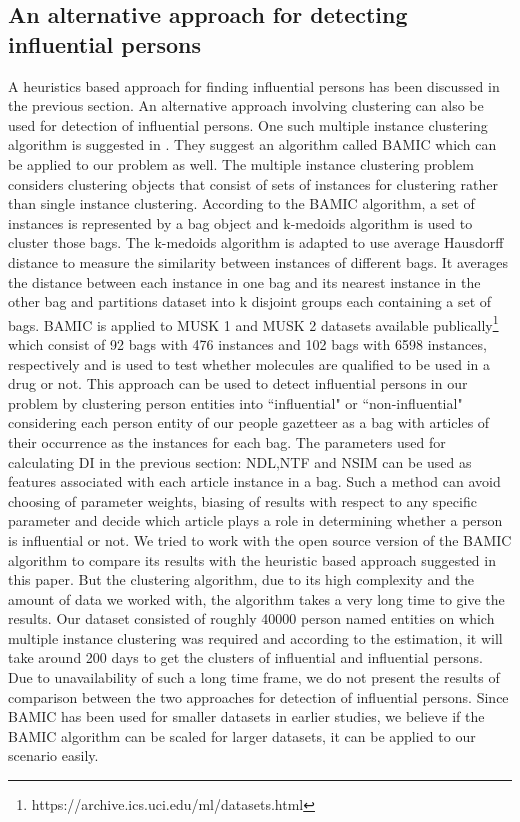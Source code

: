 \documentclass[10pt,journal,compsoc]{IEEEtran}
\begin{document}
\subsection{An alternative approach for detecting influential persons}
\label{influential:BAMIC}
A heuristics based approach for finding influential persons has been discussed in the previous section. An alternative approach involving clustering can also be used for detection of influential persons.
 One such multiple instance clustering algorithm is suggested in \cite{zhang2009multi}.  They suggest an algorithm called BAMIC which can be applied to our problem as well. The multiple instance clustering problem considers clustering objects that consist of sets of instances for clustering rather than single instance clustering. According to the BAMIC algorithm, a set of instances is represented by a bag object and k-medoids algorithm is used to cluster those bags. The k-medoids algorithm is adapted to use average Hausdorff distance to measure the similarity between instances of different bags. It averages the distance between each instance in one bag and its nearest instance in the other bag and partitions dataset into k disjoint groups each containing a set of bags. BAMIC is applied to MUSK 1 and MUSK 2 datasets available publically\footnote{https://archive.ics.uci.edu/ml/datasets.html} which consist of 92 bags with 476 instances and 102 bags with 6598 instances, respectively and is used to test whether molecules are qualified to be used in a drug or not.
 This approach can be used to detect influential persons in our problem by clustering person entities into ``influential" or ``non-influential"  considering each person entity of our people gazetteer as a bag with articles of their occurrence as the instances for each bag. 
The parameters used for calculating DI in the previous section: NDL,NTF and NSIM can be used as features associated with each article instance in a bag.
Such a method can avoid choosing of parameter weights, biasing of results with respect to any specific parameter and decide which article plays a role in determining whether a person is influential or not. 
We tried to work with the open source version of the BAMIC algorithm to compare its results with the heuristic based approach suggested in this paper. But the clustering algorithm, due to its high complexity and the amount of data we worked with, the algorithm takes a very long time to give the results. Our dataset consisted of roughly 40000 person named entities on which multiple instance clustering was required and according to the estimation, it will take around 200 days to get the clusters of influential and influential persons.  Due to unavailability of such a long time frame, we do not present the results of comparison between the two approaches for detection of influential persons. Since BAMIC has been used for smaller datasets in earlier studies, we believe if the BAMIC algorithm can be scaled for larger datasets, it can be applied to our scenario easily.
\end{document}
